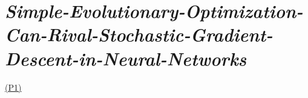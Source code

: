 \documentclass{article}
\newcommand{\paper}[2]{\hyperlink{./papers/#1.pdf.#2}{(P#2)}}
\begin{document}
\section{\textit{Simple-Evolutionary-Optimization-Can-Rival-Stochastic-Gradient-Descent-in-Neural-Networks}}
\paper{Simple-Evolutionary-Optimization-Can-Rival-Stochastic-Gradient-Descent-in-Neural-Networks}{1}








%
%
\end{document}

